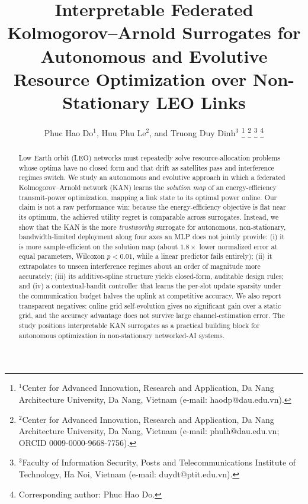 \documentclass[journal]{IEEEtran}
\newcommand{\ratioNmse}{1.8}\newcommand{\ratioReg}{2.2}
\begin{document}
\title{Interpretable Federated Kolmogorov--Arnold Surrogates for Autonomous and
Evolutive Resource Optimization over Non-Stationary LEO Links}

\author{Phuc Hao Do$^{1}$, Huu Phu Le$^{2}$, and Truong Duy Dinh$^{3}$
\thanks{$^{1}$Center for Advanced Innovation, Research and Application, Da Nang
Architecture University, Da Nang, Vietnam (e-mail: haodp@dau.edu.vn).}
\thanks{$^{2}$Center for Advanced Innovation, Research and Application, Da Nang
Architecture University, Da Nang, Vietnam (e-mail: phulh@dau.edu.vn;
ORCID 0009-0000-9668-7756).}
\thanks{$^{3}$Faculty of Information Security, Posts and Telecommunications
Institute of Technology, Ha Noi, Vietnam (e-mail: duydt@ptit.edu.vn).}
\thanks{Corresponding author: Phuc Hao Do.}}

\maketitle

\begin{abstract}
Low Earth orbit (LEO) networks must repeatedly solve resource-allocation problems
whose optima have no closed form and that drift as satellites pass and
interference regimes switch. We study an autonomous and evolutive approach in
which a federated Kolmogorov--Arnold network (KAN) learns the \emph{solution map}
of an energy-efficiency transmit-power optimization, mapping a link state to its
optimal power online. Our claim is not a raw performance win: because the
energy-efficiency objective is flat near its optimum, the achieved utility regret
is comparable across surrogates. Instead, we show that the KAN is the more
\emph{trustworthy} surrogate for autonomous, non-stationary, bandwidth-limited
deployment along four axes an MLP does not jointly provide: (i) it is more
sample-efficient on the solution map (about $\ratioNmse\times$ lower normalized
error at equal parameters, Wilcoxon $p<0.01$, while a linear predictor fails
entirely); (ii) it extrapolates to unseen interference regimes about an order of
magnitude more accurately; (iii) its additive-spline structure yields closed-form,
auditable design rules; and (iv) a contextual-bandit controller that learns the
per-slot update sparsity under the communication budget halves the uplink at
competitive accuracy. We
also report transparent negatives: online grid self-evolution gives no significant
gain over a static grid, and the accuracy advantage does not survive large
channel-estimation error. The study positions interpretable KAN surrogates as a
practical building block for autonomous optimization in non-stationary networked-AI
systems.
\end{abstract}
\end{document}
